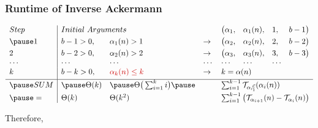 \begin{frame}
\frametitle{Runtime of Inverse Ackermann}

\begin{equation*}
\begin{array}{l|llllllll}
Step & \multicolumn{2}{l}{Initial \ Arguments} &  &  \big(\alpha_1, & \alpha_1(n), & 1, & b - 1 \big) \\[3pt]
\pause 1 & b - 1 > 0, & \alpha_1(n) > 1 & \to & \big(\alpha_2, & \alpha_2(n), & 2, & b - 2\big) \\[3pt]
2 & b - 2 > 0, & \alpha_2(n) > 2 & \to  & \big(\alpha_3, & \alpha_3(n), & 3, & b - 3\big) \\
\cdots & \cdots &\cdots & \cdots & \cdots & \cdots & \cdots \\
k & b - k > 0, & {\color{red} \alpha_{k}(n) \le k} & \to  & \multicolumn{4}{l}{k = \alpha(n)} \\[3pt] \hline
\pause SUM & \pause \Theta(k) & \pause \Theta\big(\sum_{i=1}^{k}i\big) \pause & & \multicolumn{4}{l}{\sum_{i=1}^{k-1} \runtime_{\cdt{\alpha_i}{1}} (\alpha_i(n))} \\[3pt]
\pause = & \Theta(k) & \Theta(k^2) & & \multicolumn{4}{l}{\sum_{i=1}^{k-1} \big(\runtime_{\alpha_{i+1}}(n) - \runtime_{\alpha_i}(n) \big)}
\end{array}
\end{equation*}

\smallskip

\pause
Therefore, 

\end{frame}